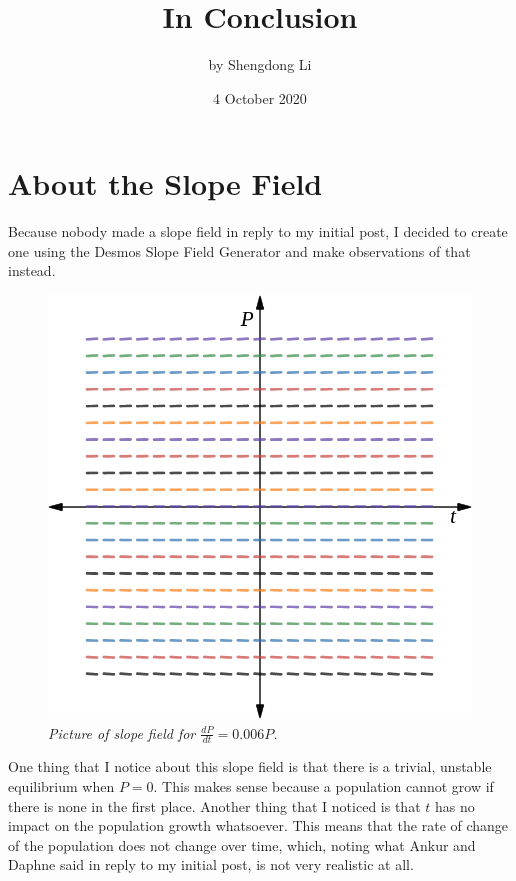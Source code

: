 \documentclass[12pt]{article}
\begin{document}
\title{In Conclusion}
\author{by Shengdong Li}
\date{4 October 2020}
\maketitle

\section{About the Slope Field}

Because nobody made a slope field in reply to my initial post, I decided to create one using the Desmos Slope Field Generator and make observations of that instead.

\begin{figure}[h]
  \begin{center}
    \includegraphics[scale=.3]{disc-3-conc-slope-field.png}
    \caption{\textit{Picture of slope field for $\frac{dP}{dt}=0.006P$.}}
  \end{center}
\end{figure}

One thing that I notice about this slope field is that there is a trivial, unstable equilibrium when $P=0$. This makes sense because a population cannot grow if there is none in the first place. Another thing that I noticed is that $t$ has no impact on the population growth whatsoever. This means that the rate of change of the population does not change over time, which, noting what Ankur and Daphne said in reply to my initial post, is not very realistic at all.
\end{document}
